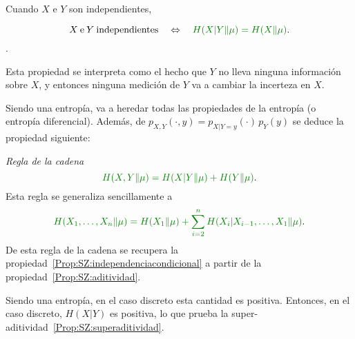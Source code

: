 Cuando $X$ e $Y$ son independientes, 
%
\begin{propiedades}
\item\label{Prop:SZ:independenciacondicional}
  \[
  X \: \mbox{e} \: Y \: \mbox{independientes} \quad \Leftrightarrow \quad \modif{H(X|Y \| \mu)
  = H(X \| \mu)}.
  \]
  .
\end{propiedades}
%
Esta  propiedad  se   interpreta  como  el  hecho  que   $Y$  no  lleva  ninguna
informaci\'on sobre  $X$, y entonces ninguna  medici\'on de $Y$ va  a cambiar la
incerteza en $X$.

Siendo    una  entrop\'ia, va  a  heredar  todas  las
propiedades  de   la  entrop\'ia  (o  entrop\'ia   diferencial).   Adem\'as,  de
$p_{X,Y}(\cdot,y) = p_{X|Y=y}(\cdot) \, p_Y(y)$ se deduce la propiedad siguiente:
%
\begin{propiedades}
\item\label{Prop:SZ:cadena}  {\it Regla de la cadena}
  \[
  \modif{H(X,Y \| \mu) =  H(X|Y \| \mu) +  H(Y \| \mu)}.
  \]
  Esta regla se generaliza sencillamente a
  \[
  \modif{H(X_1 , \ldots , X_n \| \mu) = H(X_1 \| \mu) + \sum_{i=2}^n H(X_i|X_{i-1} , \ldots , X_1 \| \mu)}.
  \]
  De      esta     regla      de      la     cadena      se     recupera      la
  propiedad~\ref{Prop:SZ:independenciacondicional}     a     partir    de     la
  propiedad~\ref{Prop:SZ:aditividad}.
\end{propiedades}
%
Siendo    una  entrop\'ia,  en  el  caso  discreto  esta  cantidad  es
positiva. Entonces, en el caso discreto,  $H(X|Y)$ es positiva, lo que prueba la
super-aditividad~\ref{Prop:SZ:superaditividad}.



